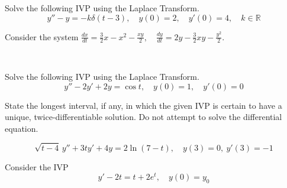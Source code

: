 \documentclass[12pt]{exam}
\begin{document}
\begin{questions}
\begin{enumerate}[label=\roman*)]
    \end{enumerate}    
    \newpage \InitialsRight 
    \LastPage     
  
    
    \newpage \InitialsLeft
    \question[7] Solve the following IVP using the Laplace Transform. 
        $$y''-y=-k\delta(t-3), \quad y(0)=2,\quad y'(0)=4, \quad k \in \mathbb R$$  %
      
    
    
    
\newpage \InitialsRight
    \question[14] 
    Consider the system $\displaystyle \frac{dx}{dt} = \frac32 x - x^2 - \frac{xy}{2} , \quad \frac{dy}{dt} = 2y - \frac 32 xy - \frac{y^2}{2}$. %
    
\newpage \InitialsLeft \\ \LastPage     
    

\newpage \InitialsRight

    \question[5] Solve the following IVP using the Laplace Transform. 
        $$y'' - 2y'  + 2y =\cos t, \quad y(0)=1,\quad y'(0)=0$$  %
  
    
    
    
\newpage \InitialsLeft
    \question[2] State the longest interval, if any, in which the given IVP is certain to have a unique, twice-differentiable solution. Do not attempt to solve the differential equation. 
    
    $$\sqrt{ t-4} \, y''+3ty'+4y=2\ln(7 - t),\quad y(3)=0,\ y'(3)=-1$$ %
    
    \vspace{2cm} 

    \question[8] 
    Consider the IVP 
    $$y' - 2 t = t + 2e^t, \quad y(0) = y_0$$ %
    \begin{parts} 

\end{parts}
\end{questions}
\end{document}
